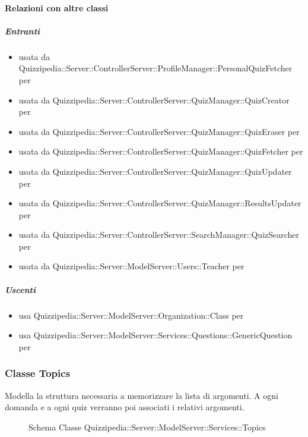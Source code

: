\paragraph{Relazioni con altre classi}
\subparagraph{Entranti}
\begin{itemize}
\item usata da Quizzipedia::Server::ControllerServer::ProfileManager::PersonalQuizFetcher per 
\item usata da Quizzipedia::Server::ControllerServer::QuizManager::QuizCreator per 
\item usata da Quizzipedia::Server::ControllerServer::QuizManager::QuizEraser per 
\item usata da Quizzipedia::Server::ControllerServer::QuizManager::QuizFetcher per 
\item usata da Quizzipedia::Server::ControllerServer::QuizManager::QuizUpdater per 
\item usata da Quizzipedia::Server::ControllerServer::QuizManager::ResultsUpdater per 
\item usata da Quizzipedia::Server::ControllerServer::SearchManager::QuizSearcher per 
\item usata da Quizzipedia::Server::ModelServer::Users::Teacher per 
\end{itemize}
\subparagraph{Uscenti}
\begin{itemize}
\item usa Quizzipedia::Server::ModelServer::Organization::Class per 
\item usa Quizzipedia::Server::ModelServer::Services::Questions::GenericQuestion per 
\end{itemize}
\subsubsection{Classe Topics}
Modella la struttura necessaria a memorizzare la lista di argomenti. A ogni domanda e a ogni quiz verranno poi associati i relativi argomenti.
\begin{figure}[H]
\centering
\noindent{}
\caption[Schema Classe Topics]{Schema Classe Quizzipedia::Server::ModelServer::Services::Topics}
\end{figure}
